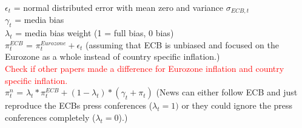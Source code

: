 \documentclass[review]{elsarticle}
\begin{document}
$\epsilon_t$ = normal distributed error with mean zero and variance $\sigma_{ECB,t}$ \\
$\gamma_t$ = media bias \\
$\lambda_t$ = media bias weight (1 = full bias, 0 bias) \\

$\pi^{ECB}_t$ = $\pi^{Eurozone}_t + \epsilon_t$ (assuming that ECB is unbiased and focused on the Eurozone as a whole instead of country specific inflation.) 
\\
\textcolor{red}{Check if other papers made a difference for Eurozone inflation and country specific inflation.}
\\

$\pi^n_t$ = $\lambda_t * \pi^{ECB}_t + (1-\lambda_t) * (\gamma_t + \pi_t)$ (News can either follow ECB and just reproduce the ECBs press conferences ($\lambda_t = 1)$ or they could ignore the press conferences completely ($\lambda_t = 0$).) \\

\end{document}
